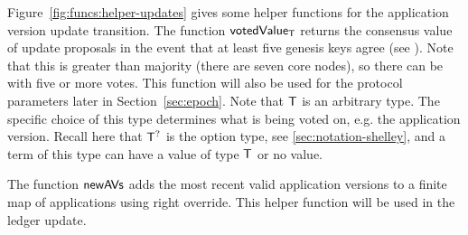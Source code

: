\clearpage

Figure~\ref{fig:funcs:helper-updates} gives some helper functions for the
application version update transition.
The function $\mathsf{votedValue_T}$ returns
the consensus value of update proposals in the event that at least five
genesis keys agree (see \cite{delegation_design}). Note that this is greater
than majority (there are seven core nodes), so there can
be  with five or more votes.
This function will also be used for the protocol parameters later in Section~\ref{sec:epoch}.
Note that $\mathsf{T}$ is an arbitrary type. The specific choice of this type
determines what is being voted on, e.g. the application version.
Recall here that $\mathsf{T}^?$ is the option type, see \ref{sec:notation-shelley},
and a term of this type can have a value of type $\mathsf{T}$ or no value.

The function $\mathsf{newAVs}$ adds the most recent valid application
versions to a finite map of applications using right override.
This helper function will be used in the ledger update.

